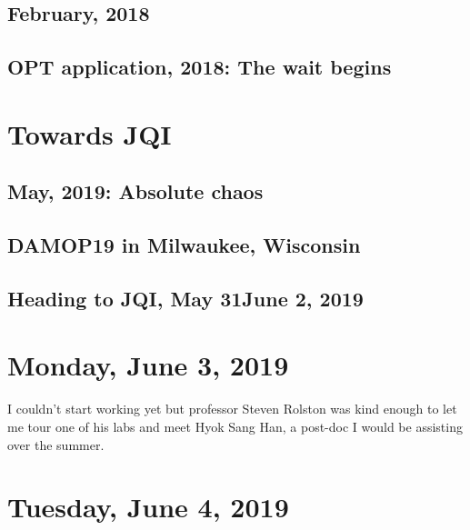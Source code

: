 \documentclass{article}
\theoremstyle{definition}
\begin{document}
\subsection{February, 2018}

\subsection{OPT application, 2018: The wait begins}

\newpage

\section{Towards JQI}

\subsection{May, 2019: Absolute chaos}

\subsection{DAMOP19 in Milwaukee, Wisconsin}

\subsection{Heading to JQI, May 31\textendash June 2, 2019}


\newpage

\section{Monday, June 3, 2019}

I couldn't start working yet but professor Steven Rolston was kind enough to let me tour one of his labs and meet Hyok Sang Han, a post-doc I would be assisting over the summer.  


\newpage



\section{Tuesday, June 4, 2019}
\newpage
\end{document}
